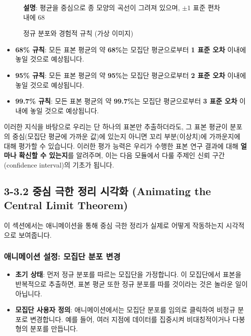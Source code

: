 \documentclass[11pt,a4paper]{article}
\theoremstyle{definition}
\begin{document}
\begin{figure}[h!]
    \centering
    \caption{정규 분포와 경험적 규칙 (가상 이미지)}
    \label{fig:empirical_rule}
    \textbf{설명}: 평균을 중심으로 종 모양의 곡선이 그려져 있으며, $\pm 1$ 표준 편차 내에 68%
\end{figure}

\begin{itemize}
    \item \textbf{68\% 규칙}: 모든 표본 평균의 약 \textbf{68\%}는 모집단 평균으로부터 \textbf{1 표준 오차} 이내에 놓일 것으로 예상됩니다.
    \item \textbf{95\% 규칙}: 모든 표본 평균의 약 \textbf{95\%}는 모집단 평균으로부터 \textbf{2 표준 오차} 이내에 놓일 것으로 예상됩니다.
    \item \textbf{99.7\% 규칙}: 모든 표본 평균의 약 \textbf{99.7\%}는 모집단 평균으로부터 \textbf{3 표준 오차} 이내에 놓일 것으로 예상됩니다.
\end{itemize}

이러한 지식을 바탕으로 우리는 단 하나의 표본만 추출하더라도, 그 표본 평균이 분포의 중심(모집단 평균에 가까운 값)에 있는지 아니면 꼬리 부분(이상치)에 가까운지에 대해 평가할 수 있습니다. 이러한 평가 능력은 우리가 수행한 표본 연구 결과에 대해 \textbf{얼마나 확신할 수 있는지}를 알려주며, 이는 다음 모듈에서 다룰 주제인 신뢰 구간(confidence interval)의 기초가 됩니다.

\newpage
\subsection{3-3.2 중심 극한 정리 시각화 (Animating the Central Limit Theorem)}

이 섹션에서는 애니메이션을 통해 중심 극한 정리가 실제로 어떻게 작동하는지 시각적으로 보여줍니다.

\subsubsection*{애니메이션 설정: 모집단 분포 변경}

\begin{itemize}
    \item \textbf{초기 상태}: 먼저 정규 분포를 따르는 모집단을 가정합니다. 이 모집단에서 표본을 반복적으로 추출하면, 표본 평균 또한 정규 분포를 따를 것이라는 것은 놀라운 일이 아닙니다.
    \item \textbf{모집단 사용자 정의}: 애니메이션에서는 모집단 분포를 임의로 클릭하여 비정규 분포로 변경합니다. 예를 들어, 여러 지점에 데이터를 집중시켜 비대칭적이거나 다봉형의 분포를 만듭니다.
\end{itemize}
\end{document}
